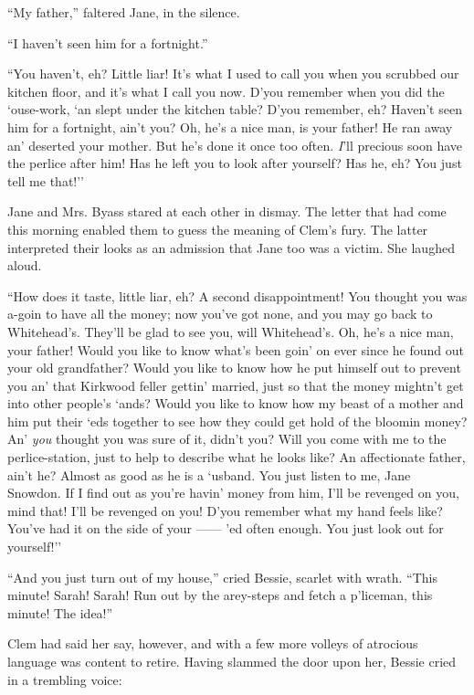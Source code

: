 ``My father,'' faltered Jane, in the silence.

``I haven't seen him for a fortnight.''

``You haven't, eh? Little liar! It's what I used to call you when you
scrubbed our kitchen floor, and it's what I call you now. D'you remember
when you did the `ouse-work, `an slept under the kitchen table? D'you
remember, eh? Haven't seen him for a fortnight, ain't you? Oh, he's a
nice man, is your father! He ran away an' deserted your mother. But he's
done it once too often. \emph{I}'ll precious soon have the perlice after
him! Has he left you to look after yourself? Has he, eh? You just tell
me that!''

Jane and Mrs. Byass stared at each other in dismay. The letter that had
come this morning enabled them to guess the meaning of Clem's fury. The
latter interpreted their {}looks as an admission that Jane too was a
victim. She laughed aloud.

``How does it taste, little liar, eh? A second disappointment! You
thought you was a-goin to have all the money; now you've got none, and
you may go back to Whitehead's. They'll be glad to see you, will
Whitehead's. Oh, he's a nice man, your father! Would you like to know
what's been goin' on ever since he found out your old grandfather? Would
you like to know how he put himself out to prevent you an' that Kirkwood
feller gettin' married, just so that the money mightn't get into other
people's `ands? Would you like to know how my beast of a mother and him
put their `eds together to see how they could get hold of the bloomin
money? An' \emph{you} thought you was sure of it, didn't you? Will you
come with me to the perlice-station, just to help to describe what he
looks like? An affectionate father, ain't he? Almost as good as he is a
`usband. You just listen to me, Jane Snowdon. If I find out as you're
havin' money from him, I'll be revenged on you, mind that! I'll be
revenged on you! D'you remember what my hand feels {}like? You've had it
on the side of your {{------}} 'ed often enough. You just look out for
yourself!''

``And you just turn out of my house,'' cried Bessie, scarlet with wrath.
``This minute! Sarah! Sarah! Run out by the arey-steps and fetch a
p'liceman, this minute! The idea!''

Clem had said her say, however, and with a few more volleys of atrocious
language was content to retire. Having slammed the door upon her, Bessie
cried in a trembling voice:

